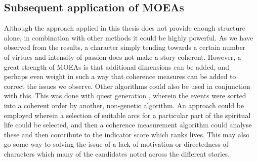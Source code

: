 \documentclass[11pt]{article}
\begin{document}
\subsection{Subsequent application of MOEAs}
Although the approach applied in this thesis does not provide enough structure alone, in combination with other methods it could be highly powerful. As we have observed from the results, a character simply tending towards a certain number of virtues and intensity of passion does not make a story coherent. However, a great strength of MOEAs is that additional dimensions can be added, and perhaps even weight in such a way that coherence measures can be added to correct the issues we observe. Other algorithms could also be used in conjunction with this. This was done with quest generation \cite{questgeneration}, wherein the events were sorted into a coherent order by another, non-genetic algorithm. An approach could be employed wherein a selection of suitable arcs for a particular part of the spiritual life could be selected, and then a coherence measurement algorithm could analyse these and then contribute to the indicator score which ranks lives. This may also go some way to solving the issue of a lack of motivation or directedness of characters which many of the candidates noted across the different stories. 
\end{document}
